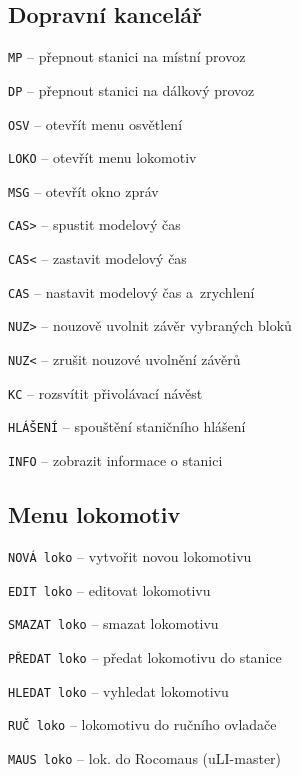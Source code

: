 \documentclass[12pt,a4paper,landscape]{article}
\begin{document}
\begin{multicols}{3}

\section{Dopravní kancelář}
\begin{compactitem}
	\item \texttt{MP} -- přepnout stanici na místní provoz
	\item \texttt{DP} -- přepnout stanici na dálkový provoz
	\item \texttt{OSV} -- otevřít menu osvětlení
	\item \texttt{LOKO} -- otevřít menu lokomotiv
	\item \texttt{MSG} -- otevřít okno zpráv
	\item \texttt{CAS>} -- spustit modelový čas
	\item \texttt{CAS<} -- zastavit modelový čas
	\item \texttt{CAS} -- nastavit modelový čas	a~zrychlení
	\item \texttt{NUZ>} -- nouzově uvolnit závěr vybraných bloků
	\item \texttt{NUZ<} -- zrušit nouzové uvolnění závěrů
	\item \texttt{KC} -- rozsvítit přivolávací návěst
	\item \texttt{HLÁŠENÍ} -- spouštění staničního hlášení	
	\item \texttt{INFO} -- zobrazit informace o stanici
\end{compactitem}

\subsection{Menu lokomotiv}
\begin{compactitem}
	\item \texttt{NOVÁ loko} -- vytvořit novou lokomotivu
	\item \texttt{EDIT loko} -- editovat lokomotivu
	\item \texttt{SMAZAT loko} -- smazat lokomotivu
	\item \texttt{PŘEDAT loko} -- předat lokomotivu do stanice
	\item \texttt{HLEDAT loko} -- vyhledat lokomotivu
	\item \texttt{RUČ loko} -- lokomotivu do ručního ovladače
	\item \texttt{MAUS loko} -- lok. do Rocomaus (uLI-master)
\end{compactitem}


\end{multicols}
\end{document}
